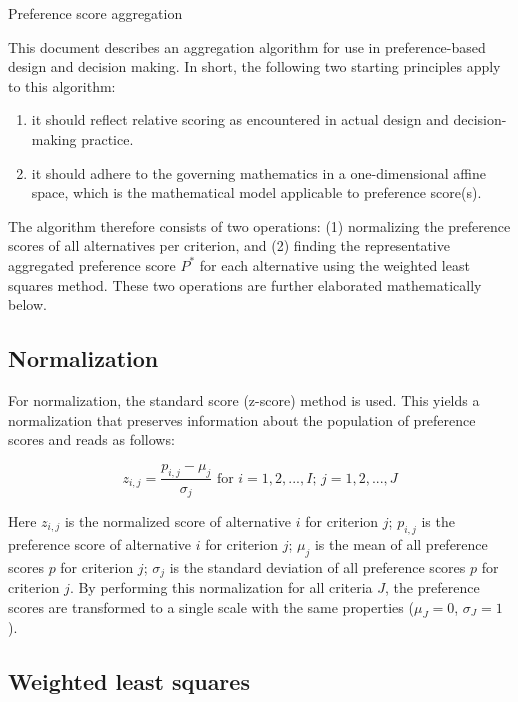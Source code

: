 \documentclass[a4paper]{article}
\begin{document}
\begin{center}
  \Large{Preference score aggregation}
\end{center}


This document describes an aggregation algorithm for use in preference-based design and decision making. In short, the following two starting principles apply to this algorithm:

\begin{enumerate}
    \item it should reflect relative scoring as encountered in actual design and decision-making practice.

    \item it should adhere to the governing mathematics in a one-dimensional affine space, which is the mathematical model applicable to preference score(s).
\end{enumerate}

The algorithm therefore consists of two operations: (1) normalizing the preference scores of all alternatives per criterion, and (2) finding the representative aggregated preference score $P^*$ for each alternative using the weighted least squares method. These two operations are further elaborated mathematically below.

\subsection*{Normalization}

For normalization, the standard score (z-score) method is used. This yields a normalization that preserves information about the population of preference scores and reads as follows:

\begin{equation}
    z_{i,j} = \frac{p_{i,j}-\mu_j}{\sigma_j}\textrm{ for }
    i=1,2,...,I \textrm{; }
    j=1,2,...,J
\end{equation}

Here $z_{i,j}$ is the normalized score of alternative $i$ for criterion $j$; $p_{i,j}$ is the preference score of alternative $i$ for criterion $j$; $\mu_j$ is the mean of all preference scores $p$ for criterion $j$; $\sigma_j$ is the standard deviation of all preference scores $p$ for criterion $j$. By performing this normalization for all criteria $J$, the preference scores are transformed to a single scale with the same properties ($\mu_J=0$, $\sigma_J=1$). 

\subsection*{Weighted least squares}
\end{document}

